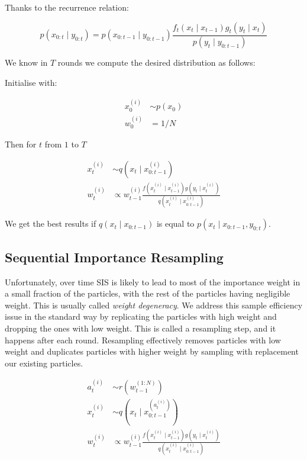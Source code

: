 \documentclass[
]{ceurart}
\begin{document}
Thanks to the recurrence relation:

\begin{equation}
p(x_{0:t} \mid y_{0:t}) = p(x_{0:t-1} \mid y_{0:t-1}) \frac{f_t(x_t \mid x_{t-1}) g_t(y_t \mid x_t)}{p(y_t \mid y_{0:t-1})}
\end{equation}

We know in $T$ rounds we compute the desired distribution as follows:

Initialise with:

\begin{align}
x_0^{(i)} &\sim p(x_0) \\
w_0^{(i)} &= 1/N
\end{align}

Then for $t$ from $1$ to $T$

\begin{align}
  x_t^{(i)} &\sim q(x_t \mid x^{(i)}_{0:t-1}) \\
  w_t^{(i)} &\propto w_{t-1}^{(i)} \frac{f(x^{(i)}_t \mid x^{(i)}_{t-1})g(y_t \mid x^{(i)}_t)}{q(x^{(i)}_t \mid x^{(i)}_{0:t-1})}
\end{align}

We get the best results if $q(x_t \mid x_{0:t-1})$ is equal to $p(x_t \mid x_{0:t-1}, y_{0:t})$.

\subsection{Sequential Importance Resampling}

Unfortunately, over time SIS is likely to lead to most of the
importance weight in a small fraction of the particles, with the rest
of the particles having negligible weight. This is usually called
\emph{weight degeneracy}. We address this sample efficiency issue in
the standard way by replicating the particles with high weight and
dropping the ones with low weight. This is called a resampling step,
and it happens after each round. Resampling effectively removes
particles with low weight and duplicates particles with higher weight
by sampling with replacement our existing particles.

\begin{align*}
  a_t^{(i)} &\sim r(w_{t-1}^{(1:N)}) \\
  x_t^{(i)} &\sim q(x_t \mid x^{(a_t^{(i)})}_{0:t-1}) \\
  w_t^{(i)} &\propto w_{t-1}^{(i)} \frac{f(x^{(i)}_t \mid x^{(i)}_{t-1})g(y_t \mid x^{(i)}_t)}{q(x^{(i)}_t \mid x^{(i)}_{0:t-1})}
\end{align*}
\end{document}
